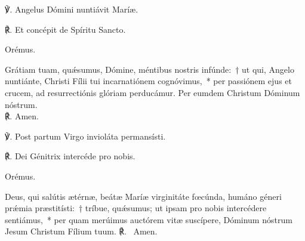 
℣. Angelus Dómini nuntiávit Maríæ.

℟. Et concépit de Spíritu Sancto.

Orémus.

\noindent Grátiam tuam, quǽsumus, Dómine, méntibus nostris infúnde:~† ut qui, Angelo nuntiánte, Christi Fílii tui incarnatiónem cognóvimus,~* per passiónem ejus et crucem, ad resurrectiónis glóriam perducámur. Per eumdem Christum Dóminum nóstrum. \\ ℟. Amen.


℣. Post partum Virgo invioláta permansísti.

℟. Dei Génitrix intercéde pro nobis.

Orémus.

\noindent Deus, qui salútis ætérnæ, beátæ Maríæ virginitáte fœcúnda, humáno géneri prǽmia præstitísti:~† tríbue, quǽsumus; ut ipsam pro nobis intercédere sentiámus,~* per quam merúimus auctórem vitæ suscípere, Dóminum nóstrum Jesum Christum Fílium tuum. ℟.~ Amen.
